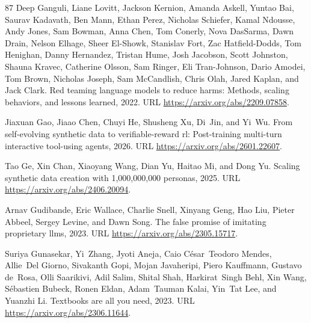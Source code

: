 \begin{thebibliography}{87}
Deep Ganguli, Liane Lovitt, Jackson Kernion, Amanda Askell, Yuntao Bai, Saurav Kadavath, Ben Mann, Ethan Perez, Nicholas Schiefer, Kamal Ndousse, Andy Jones, Sam Bowman, Anna Chen, Tom Conerly, Nova DasSarma, Dawn Drain, Nelson Elhage, Sheer El-Showk, Stanislav Fort, Zac Hatfield-Dodds, Tom Henighan, Danny Hernandez, Tristan Hume, Josh Jacobson, Scott Johnston, Shauna Kravec, Catherine Olsson, Sam Ringer, Eli Tran-Johnson, Dario Amodei, Tom Brown, Nicholas Joseph, Sam McCandlish, Chris Olah, Jared Kaplan, and Jack Clark.
\newblock Red teaming language models to reduce harms: Methods, scaling behaviors, and lessons learned, 2022.
\newblock URL \url{https://arxiv.org/abs/2209.07858}.

Jiaxuan Gao, Jiaao Chen, Chuyi He, Shusheng Xu, Di~Jin, and Yi~Wu.
\newblock From self-evolving synthetic data to verifiable-reward rl: Post-training multi-turn interactive tool-using agents, 2026.
\newblock URL \url{https://arxiv.org/abs/2601.22607}.

Tao Ge, Xin Chan, Xiaoyang Wang, Dian Yu, Haitao Mi, and Dong Yu.
\newblock Scaling synthetic data creation with 1,000,000,000 personas, 2025.
\newblock URL \url{https://arxiv.org/abs/2406.20094}.

Arnav Gudibande, Eric Wallace, Charlie Snell, Xinyang Geng, Hao Liu, Pieter Abbeel, Sergey Levine, and Dawn Song.
\newblock The false promise of imitating proprietary llms, 2023.
\newblock URL \url{https://arxiv.org/abs/2305.15717}.

Suriya Gunasekar, Yi~Zhang, Jyoti Aneja, Caio César~Teodoro Mendes, Allie~Del Giorno, Sivakanth Gopi, Mojan Javaheripi, Piero Kauffmann, Gustavo de~Rosa, Olli Saarikivi, Adil Salim, Shital Shah, Harkirat~Singh Behl, Xin Wang, Sébastien Bubeck, Ronen Eldan, Adam~Tauman Kalai, Yin~Tat Lee, and Yuanzhi Li.
\newblock Textbooks are all you need, 2023.
\newblock URL \url{https://arxiv.org/abs/2306.11644}.


\end{thebibliography}
